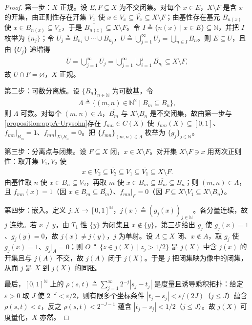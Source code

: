 \documentclass[../main.tex]{subfiles}
\begin{document}
\begin{proof}
第一步：$X$ 正规。设 $E,F\subseteq X$ 为不交闭集。对每个 $x\in E$，$X\setminus F$ 是含 $x$ 的开集，由正则性存在开集 $V_x$ 使 $x\in V_x\subseteq\overline{V_x}\subseteq X\setminus F$；由基性存在基元 $B_{n(x)}$ 使 $x\in B_{n(x)}\subseteq V_x$，于是 $\overline{B_{n(x)}}\subseteq X\setminus F$。令 $I\triangleq\{n(x)\mid x\in E\}\subseteq\mathbb{N}$，并把 $I$ 枚举为 $\{n_j\}$；令 $U_j\triangleq B_{n_1}\cup\cdots\cup B_{n_j}$，$U\triangleq\bigcup_{j=1}^\infty U_j=\bigcup_{n\in I}B_n$。则 $E\subseteq U$，且由 $\{U_j\}$ 递增得
\begin{align*}
\overline{U}=\bigcup_{j=1}^\infty\overline{U_j}=\bigcup_{j=1}^\infty\bigcup_{i=1}^j\overline{B_{n_i}}\subseteq X\setminus F,
\end{align*}
故 $\overline{U}\cap F=\varnothing$，$X$ 正规。

第二步：可数分离族。设 $\{B_n\}_{n\in\mathbb{N}}$ 为可数基，令
\begin{align*}
\Lambda\triangleq\{(m,n)\in\mathbb{N}^2\mid \overline{B_m}\subseteq B_n\},
\end{align*}
则 $\Lambda$ 可数。对每个 $(m,n)\in\Lambda$，$\overline{B_m}$ 与 $X\setminus B_n$ 是不交闭集，故由第一步与\cref{proposition:appA-Urysohn}存在 $f_{mn}\in C(X)$ 使 $f_{mn}(X)\subseteq[0,1]$、$f_{mn}|_{\overline{B_m}}=1$、$f_{mn}|_{X\setminus B_n}=0$。把 $\{f_{mn}\}_{(m,n)\in\Lambda}$ 枚举为 $\{g_j\}_{j\in\mathbb{N}}$。

第三步：分离点与闭集。设 $F\subseteq X$ 闭，$x\in X\setminus F$。对开集 $X\setminus F\ni x$ 用两次正则性：取开集 $V_1,V_2$ 使
\begin{align*}
x\in V_2\subseteq\overline{V_2}\subseteq V_1\subseteq\overline{V_1}\subseteq X\setminus F.
\end{align*}
由基性取 $n$ 使 $x\in B_n\subseteq V_2$，再取 $m$ 使 $x\in B_m\subseteq\overline{B_m}\subseteq B_n$；则 $(m,n)\in\Lambda$，且 $f_{mn}(x)=1$（因 $x\in B_m\subseteq\overline{B_m}$）、$f_{mn}|_F=0$（因 $F\subseteq X\setminus V_1\subseteq X\setminus B_n$）。

第四步：嵌入。定义 $j:X\to[0,1]^{\mathbb{N}}$，$j(x)\triangleq(g_j(x))_{j\in\mathbb{N}}$。各分量连续，故 $j$ 连续。若 $x\neq y$，由 $T_1$ 性 $\{y\}$ 为闭集且 $x\notin\{y\}$，第三步给出 $g_j$ 使 $g_j(x)=1$、$g_j(y)=0$，故 $j(x)\neq j(y)$，$j$ 为单射。设 $A\subseteq X$ 闭、$x\notin A$，取 $g_j$ 使 $g_j(x)=1$、$g_j|_A=0$；则 $O\triangleq\{z\in j(X)\mid z_j>1/2\}$ 是 $j(X)$ 中含 $j(x)$ 的开集且与 $j(A)$ 不交，故 $j(A)$ 闭于 $j(X)$。于是 $j$ 把闭集映为像中的闭集，从而 $j$ 是 $X$ 到 $j(X)$ 的同胚。

最后，$[0,1]^{\mathbb{N}}$ 上的 $\rho(s,t)\triangleq\sum_{j=1}^\infty2^{-j}|s_j-t_j|$ 是度量且诱导乘积拓扑：给定 $\varepsilon>0$ 取 $J$ 使 $2^{-J}<\varepsilon/2$，则有限多个坐标条件 $|t_j-s_j|<\varepsilon/(2J)$（$j\leqslant J$）蕴含 $\rho(s,t)<\varepsilon$，反之 $\rho(s,t)<2^{-J-1}$ 蕴含 $|t_j-s_j|<1/2$（$j\leqslant J$）。故 $j(X)$ 可度量化，$X$ 亦然。
\end{proof}
\end{document}
